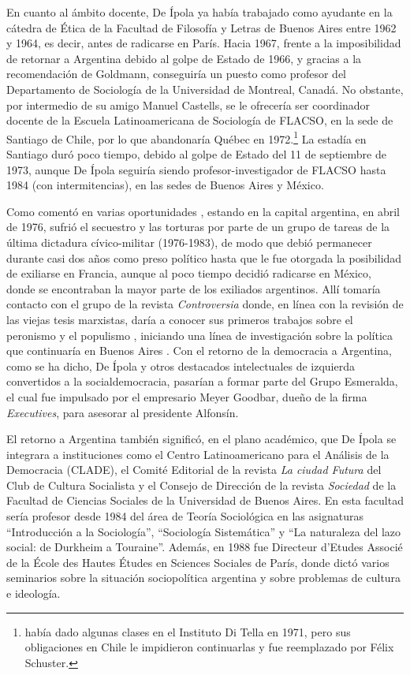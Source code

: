 {En cuanto al ámbito docente, De Ípola ya había trabajado como ayudante en la cátedra de Ética de la Facultad de Filosofía y Letras de Buenos Aires entre 1962 y 1964, es decir, antes de radicarse en París. Hacia 1967, frente a la imposibilidad de retornar a Argentina debido al golpe de Estado de 1966, y gracias a la recomendación de Goldmann, conseguiría un puesto como profesor del Departamento de Sociología de la Universidad de Montreal, Canadá. No obstante, por intermedio de su amigo Manuel Castells, se le ofrecería ser coordinador docente de la Escuela Latinoamericana de Sociología de FLACSO, en la sede de Santiago de Chile, por lo que abandonaría Québec en 1972.\footnote{\textcite{1606-DEIPOLA2010} había dado algunas clases en el Instituto Di Tella en 1971, pero sus obligaciones en Chile le impidieron continuarlas y fue reemplazado por Félix Schuster.} La estadía en Santiago duró poco tiempo, debido al golpe de Estado del 11 de septiembre de 1973, aunque De Ípola seguiría siendo profesor-investigador de FLACSO hasta 1984 (con intermitencias), en las sedes de Buenos Aires y México.

Como comentó en varias oportunidades \parencite{1586-DEIPOLA1982,1601-DEIPOLA1994,1593-DEIPOLA2005,1589-DEIPOLA2021}, estando en la capital argentina, en abril de 1976, sufrió el secuestro y las torturas por parte de un grupo de tareas de la última dictadura cívico-militar (1976-1983), de modo que debió permanecer durante casi dos años como preso político hasta que le fue otorgada la posibilidad de exiliarse en Francia, aunque al poco tiempo decidió radicarse en México, donde se encontraban la mayor parte de los exiliados argentinos. Allí tomaría contacto con el grupo de la revista \emph{Controversia} donde, en línea con la revisión de las viejas tesis marxistas, daría a conocer sus primeros trabajos sobre el peronismo y el populismo \parencite[122]{1922-DEIPOLA1979}, iniciando una línea de investigación sobre la política que continuaría en Buenos Aires \parencite{1588-DEIPOLA1989}. Con el retorno de la democracia a Argentina, como se ha dicho, De Ípola y otros destacados intelectuales de izquierda convertidos a la socialdemocracia, pasarían a formar parte del Grupo Esmeralda, el cual fue impulsado por el empresario Meyer Goodbar, dueño de la firma \emph{Executives}, para asesorar al presidente Alfonsín.

El retorno a Argentina también significó, en el plano académico, que De Ípola se integrara a instituciones como el Centro Latinoamericano para el Análisis de la Democracia (CLADE), el Comité Editorial de la revista \emph{La ciudad Futura} del Club de Cultura Socialista y el Consejo de Dirección de la revista \emph{Sociedad} de la Facultad de Ciencias Sociales de la Universidad de Buenos Aires. En esta facultad sería profesor desde 1984 del área de Teoría Sociológica en las asignaturas \enquote{Introducción a la Sociología}, \enquote{Sociología Sistemática} y \enquote{La naturaleza del lazo social: de Durkheim a Touraine}. Además, en 1988 fue Directeur d'Etudes Associé de la École des Hautes Études en Sciences Sociales de París, donde dictó varios seminarios sobre la situación sociopolítica argentina y sobre problemas de cultura e ideología.

}
